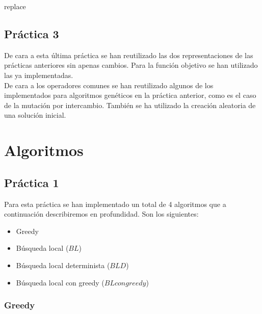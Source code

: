 \documentclass[11pt,a4paper]{article}
\begin{document}
	\begin{algorithm}[H]
		\caption{replace}
	\end{algorithm}

	\subsection{Práctica 3} \label{sec33}
	
	De cara a esta última práctica se han reutilizado las dos representaciones de las prácticas anteriores sin apenas cambios. Para la función objetivo se han utilizado las ya implementadas. \\
	
	De cara a los operadores comunes se han reutilizado algunos de los implementados para algoritmos genéticos en la práctica anterior, como es el caso de la mutación por intercambio. También se ha utilizado la creación aleatoria de una solución inicial.

	\section{Algoritmos}
	
 	\subsection{Práctica 1}
	
	Para esta práctica se han implementado un total de 4 algoritmos que a continuación describiremos en profundidad. Son los siguientes:
	\begin{itemize}
		\item Greedy
		\item Búsqueda local ($BL$)
		\item Búsqueda local determinista ($BLD$)
		\item Búsqueda local con greedy ($BL con greedy$)
	\end{itemize}
		
	\subsubsection{Greedy} \label{algoritmogreedy}
	
\end{document}
